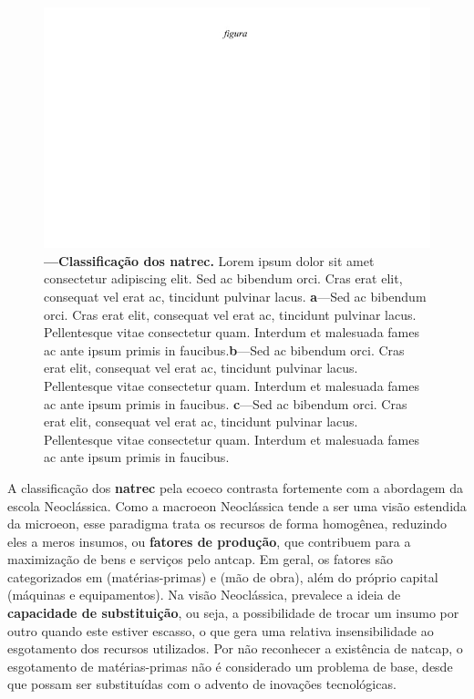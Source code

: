 \documentclass[./main.tex]{subfiles}
\begin{document}
\begin{figure}[t!] 
\centering				
\includegraphics[width=0.98\linewidth]{figs/fig_m.jpg}		
\caption[Classificação dos recursos naturais]
{\textbf{---\;Classificação dos \gls{natrec}.}
    Lorem ipsum dolor sit amet consectetur adipiscing elit. Sed ac bibendum orci. Cras erat elit, consequat vel erat ac, tincidunt pulvinar lacus. \;\textbf{a}\;---\;Sed ac bibendum orci. Cras erat elit, consequat vel erat ac, tincidunt pulvinar lacus. Pellentesque vitae consectetur quam. Interdum et malesuada fames ac ante ipsum primis in faucibus.\;\textbf{b}\;---\;Sed ac bibendum orci. Cras erat elit, consequat vel erat ac, tincidunt pulvinar lacus. Pellentesque vitae consectetur quam. Interdum et malesuada fames ac ante ipsum primis in faucibus. \;\textbf{c}\;---\;Sed ac bibendum orci. Cras erat elit, consequat vel erat ac, tincidunt pulvinar lacus. Pellentesque vitae consectetur quam. Interdum et malesuada fames ac ante ipsum primis in faucibus.
}
\label{fig:eco:natrec} 		
\end{figure}

\par A classificação dos \textbf{\gls{natrec}} pela \gls{ecoeco} contrasta fortemente com a abordagem da escola Neoclássica. Como a \gls{macroeon} Neoclássica tende a ser uma visão estendida da \gls{microeon}, esse \gls{paradigma} trata os recursos de forma homogênea, reduzindo eles a meros insumos, ou \textbf{fatores de produção}, que contribuem para a maximização de bens e serviços pelo \gls{antcap}. Em geral, os fatores são categorizados em  (matérias-primas) e  (mão de obra), além do próprio capital (máquinas e equipamentos). Na visão Neoclássica, prevalece a ideia de  \textbf{capacidade de substituição}, ou seja, a possibilidade de trocar um insumo por outro quando este estiver escasso, o que gera uma relativa insensibilidade ao esgotamento dos recursos utilizados. Por não reconhecer a existência de \gls{natcap}, o esgotamento de matérias-primas não é considerado um problema de base, desde que possam ser substituídas com o advento de inovações tecnológicas. 
\end{document}
